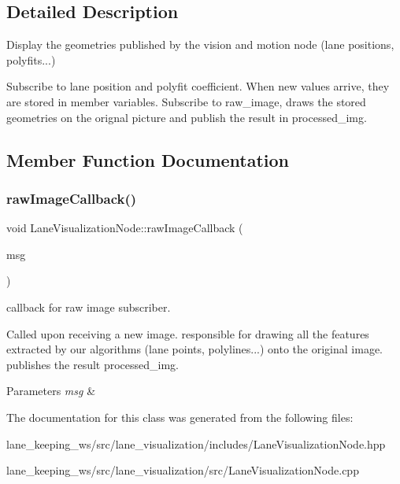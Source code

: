 \subsection{Detailed Description}
Display the geometries published by the vision and motion node (lane positions, polyfits...) 

Subscribe to lane position and polyfit coefficient. When new values arrive, they are stored in member variables. Subscribe to raw\+\_\+image, draws the stored geometries on the orignal picture and publish the result in processed\+\_\+img. 

\subsection{Member Function Documentation}
\mbox{\label{classLaneVisualizationNode_a659b897bbab6410ac46e7ada948b7de2}} 
\subsubsection{\texorpdfstring{raw\+Image\+Callback()}{rawImageCallback()}}
{\footnotesize\ttfamily void Lane\+Visualization\+Node\+::raw\+Image\+Callback (\begin{DoxyParamCaption}\item[{const sensor\+\_\+msgs\+::msg\+::\+Image\+::\+Shared\+Ptr}]{msg }\end{DoxyParamCaption})\hspace{0.3cm}{\ttfamily [private]}}



callback for raw image subscriber. 

Called upon receiving a new image. responsible for drawing all the features extracted by our algorithms (lane points, polylines...) onto the original image. publishes the result processed\+\_\+img.


\begin{DoxyParams}{Parameters}
{\em msg} & \\
\hline
\end{DoxyParams}


The documentation for this class was generated from the following files\+:\begin{DoxyCompactItemize}
\item 
lane\+\_\+keeping\+\_\+ws/src/lane\+\_\+visualization/includes/Lane\+Visualization\+Node.\+hpp\item 
lane\+\_\+keeping\+\_\+ws/src/lane\+\_\+visualization/src/Lane\+Visualization\+Node.\+cpp\end{DoxyCompactItemize}
